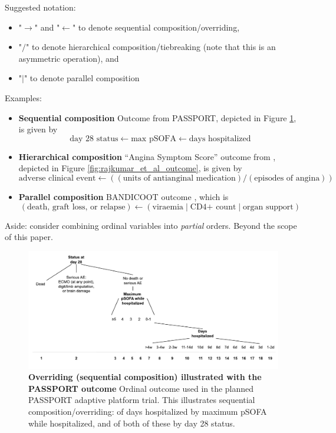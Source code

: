 \documentclass[
  11pt,
  fleqn
]{article}
\begin{document}
Suggested notation:
\begin{itemize}
  \item "$\rightarrow$" and "$\leftarrow$" to denote sequential
    composition/overriding,
  \item "$/$" to denote hierarchical composition/tiebreaking
    (note that this is an asymmetric operation), and
  \item "$|$" to denote parallel composition
\end{itemize}

Examples:

\begin{itemize}
  \item \textbf{Sequential composition} Outcome from PASSPORT,
    depicted in Figure
    \ref{fig:passport_outcome}, is given by
    \[ \text{day 28 status} \leftarrow \text{max pSOFA}
      \leftarrow \text{days
      hospitalized}
    \]
  \item
    \textbf{Hierarchical composition} ``Angina Symptom Score'' outcome from
    \citet{rajkumarPlaceboControlledTrialPercutaneous2023},
    depicted in Figure
    \ref{fig:rajkumar_et_al_outcome}, is given by \[
      \text{adverse clinical event} \leftarrow ((\text{units of
    antianginal medication}) / (\text{episodes of angina})) \]

  \item \textbf{Parallel composition} BANDICOOT outcome
    \citep{walkerCodesigningNovelOrdinal2025}, which is
    \[
      (\text{death, graft loss, or relapse}) \leftarrow
      (\text{viraemia} \;|\;
      \text{CD4+ count} \;|\; \text{organ support})
    \]
\end{itemize}

Aside: \citet{wittkowskiCombiningSeveralOrdinal2004} consider combining
ordinal variables into \emph{partial} orders. Beyond the scope of
this paper.

\begin{figure}
  \includegraphics[width=7in]{passport_ordinal_outcome_sequential.pdf}
  \caption{\textbf{Overriding (sequential composition) illustrated
    with the PASSPORT outcome} Ordinal outcome used in the planned
    PASSPORT adaptive
    platform trial. This illustrates sequential composition/overriding:
    of days hospitalized by maximum pSOFA while hospitalized, and of
  both of these by day 28 status.}
  \label{fig:passport_outcome}
\end{figure}
\end{document}
